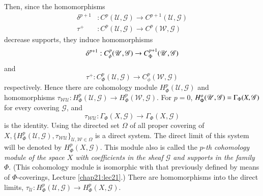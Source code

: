 Then, since the homomorphisms
\begin{align*}
\delta^{p+1}&:C^p(\mathscr{U},\mathscr{G})\to
C^{p+1}(\mathscr{U},\mathscr{G})\\ 
\tau^+ &: C^p (\mathscr{U},\mathscr{G}) \to C^p
(\mathscr{W},\mathscr{G}) 
\end{align*}
decrease supports, they induce homomorphisms
$$
\delta ^{p+1}:C^p_\phi(\mathscr{U},\mathscr{G})\to
C^{p+1}_\Phi(\mathscr{U},\mathscr{G})\\ 
$$
and
$$
\tau ^+ : C^p_\Phi (\mathscr{U},\mathscr{G}) \to C^p_\phi
(\mathscr{W},\mathscr{G}) 
$$
respectively. Hence there are cohomology module $H^p_ \Phi
(\mathscr{U},\mathscr{G})$ and homomorphisms\pageoriginale
$\tau_{\mathscr{W}\mathscr{U}}:H^p_\Phi (\mathscr{U},\mathscr{G})\to
H^p_\Phi (\mathscr{W},\mathscr{G})$. For $p=0$, $H^o_ \Phi
(\mathscr{U},\break\mathscr{G})=\Gamma_ \Phi(X, \mathscr{G})$ for every
covering $\mathscr{G}$, and  
$$
\tau_{\mathscr{W}\mathscr{U}}:\Gamma_ \Phi(X, \mathscr{G}) \to \Gamma_
\Phi(X, \mathscr{G}) 
$$
is the identity. Using the directed set $\Omega$ of all proper
covering of \break $X, \{ H^p_ \Phi(\mathscr{U},\mathscr{G}),
\tau_{\mathscr{W}\mathscr{U}} \}_{\mathscr{U},\mathscr{W} \in \Omega}$
is a direct system. The direct limit of this system will be denoted by
$ H^p_\Phi(X, \mathscr{G})$. This module also is called the $p$-\textit{th cohomology module of the space $X$ with coefficients in
  the sheaf $\mathscr{G}$ and supports in the family $\Phi$}. (This
cohomology module is isomorphic with that previously defined by means
of $\Phi$-coverings, Lecture \ref{chap21:lec21}.) There are
homomorphisms into the 
direct limits, $\tau_ \mathscr{U}:H^p_ \Phi
(\mathscr{U},\mathscr{G})\to H^p_ \Phi (X,\mathscr{G})$. 

